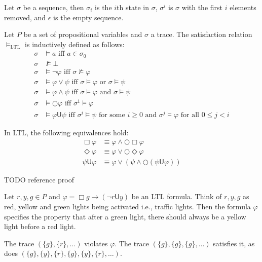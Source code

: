 \documentclass[a4paper]{article}
\newcommand{\U}{\mathsf{U}}
\newcommand{\tand}{\text{ and }}
\newcommand{\tor}{\text{ or }}
\newcommand{\tiff}{\text{ iff }}
\newcommand{\fsome}{\text{ for some }}
\newcommand{\fall}{\text{ for all }}
\begin{document}
\begin{notn}
Let $\sigma$ be a sequence, then $\sigma_i$ is the $i$th state in $\sigma$, $\sigma^i$ is $\sigma$ with the first $i$ elements removed, and $\epsilon$ is the empty sequence.
\end{notn}

\begin{defn}\label{ltlsem}

  Let $P$ be a set of propositional variables and $\sigma$ a trace. The satisfaction relation $\vDash_{\text{LTL}}$ is inductively defined as follows:
\begin{align*}
  \sigma &\vDash a \tiff a \in \sigma_0\\
  \sigma &\nvDash \bot\\
  \sigma &\vDash \neg \varphi \tiff \sigma \nvDash \varphi\\
  \sigma &\vDash \varphi \lor \psi \tiff \sigma \vDash \varphi \tor \sigma \vDash \psi\\
  \sigma &\vDash \varphi \land \psi \tiff \sigma \vDash \varphi \tand \sigma \vDash \psi\\
  \sigma &\vDash \bigcirc \varphi \tiff \sigma^1 \vDash \varphi\\
  \sigma &\vDash \varphi \U \psi \tiff \sigma^i \vDash \psi \fsome i \geq 0 \tand \sigma^j \vDash \varphi \fall 0 \leq j < i
\end{align*}

\end{defn}

\begin{lem}\label{ltlexp}

  In LTL, the following equivalences hold:
  \begin{align}
    \Box \varphi &\equiv \varphi \land \bigcirc \Box \varphi\label{elbox}\\
    \Diamond \varphi &\equiv \varphi \lor \bigcirc \Diamond \varphi\label{eldiamond}\\
    \psi \U \varphi &\equiv \varphi \lor (\psi \land \bigcirc (\psi \U \varphi))\label{elU}
  \end{align}

\end{lem}

TODO reference proof

\begin{eg}\label{ltleg}
  Let $r,y,g\in P$ and $\varphi = \Box g \to (\neg r \U y)$ be an LTL formula. Think of $r,y,g$ as red, yellow and green lights being activated i.e., traffic lights. Then the formula $\varphi$ specifies the property that after a green light, there should always be a yellow light before a red light.

  The trace $(\{g\},\{r\},\dots)$ violates $\varphi$. The trace $(\{g\},\{g\},\{g\},\dots)$ satisfies it, as does $(\{g\},\{y\},\{r\},\{g\},\{y\},\{r\},\dots)$.
\end{eg}
\end{document}
